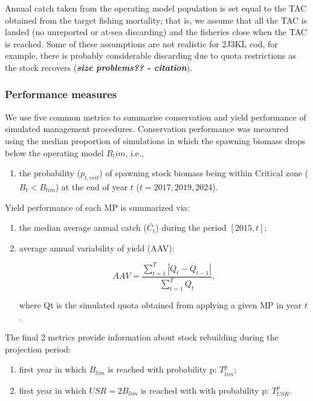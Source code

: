 \documentclass[12pt,]{article}
\providecommand{\tightlist}{%
  \setlength{\itemsep}{0pt}\setlength{\parskip}{0pt}}
\begin{document}
Annual catch taken from the operating model population is set equal to
the TAC obtained from the target fishing mortality; that is, we assume
that all the TAC is landed (no unreported or at-sea discarding) and the
fisheries close when the TAC is reached. Some of these assumptions are
not realistic for 2J3KL cod, for example, there is probably considerable
discarding due to quota restrictions as the stock recovers
(\textbf{\emph{size problems?? - citation}}).

\subsubsection{Performance measures}\label{performance-measures}

We use five common metrics to summarise conservation and yield
performance of simulated management procedures. Conservation performance
was measured using the median proportion of simulations in which the
spawning biomass drops below the operating model \(B_lim\), i.e.,

\begin{enumerate}
\def\labelenumi{\roman{enumi}.}
\tightlist
\item
  the probability (\(p_{t,crit}\)) of spawning stock biomass being
  within Critical zone (\(B_t < B_{lim}\)) at the end of year \(t\)
  (\(t = 2017, 2019, 2024\)).
\end{enumerate}

Yield performance of each MP is summarized via:

\begin{enumerate}
\def\labelenumi{\roman{enumi}.}
\setcounter{enumi}{1}
\tightlist
\item
  the median average annual catch (\(\bar{C_t}\)) during the period
  \([2015,t]\);
\item
  average annual variability of yield (AAV):

  \begin{equation}
  AAV = \frac{\sum_{t=1}^T |Q_t - Q_{t-1}| }{\sum_{t = 1}^T Q_t},
  \end{equation}

  \noindent where Qt is the simulated quota obtained from applying a
  given MP in year \(t\).
\end{enumerate}

The final 2 metrics provide information about stock rebuilding during
the projection period:

\begin{enumerate}
\def\labelenumi{\roman{enumi}.}
\setcounter{enumi}{3}
\tightlist
\item
  first year in which \(B_{lim}\) is reached with probability p:
  \(T_{lim}^{p}\);
\item
  first year in which \(USR = 2B_{lim}\) is reached with with
  probability p: \(T_{USR}^{p}\).
\end{enumerate}
\end{document}
